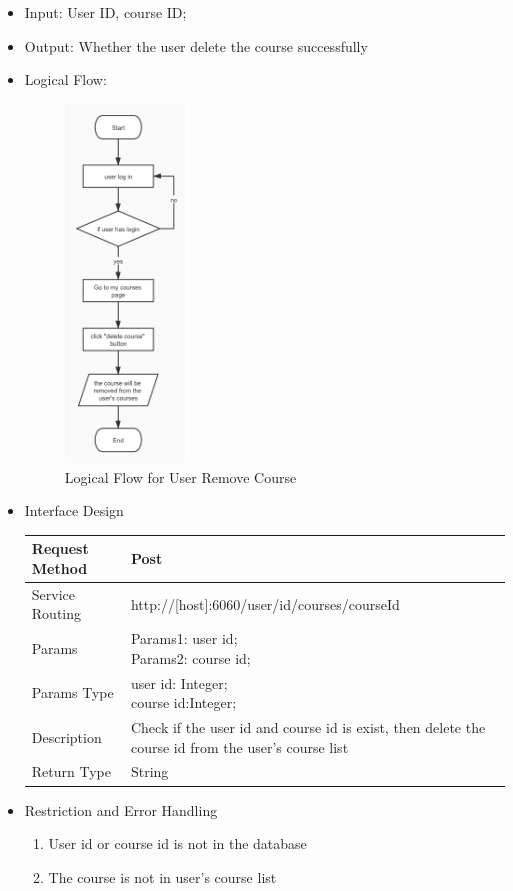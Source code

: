 \documentclass[16pt]{scrreprt}
\begin{document}
\begin{itemize}
	\item Input: User ID, course ID; 
	\item Output: Whether the user delete the course successfully
	\item Logical Flow:
	 \begin{figure}[H]
	\centering
	\includegraphics[width=0.3\textwidth]{diagrams/user-remove-course.jpg}
	\caption{Logical Flow for User Remove Course}
\end{figure}
	\item Interface Design
	\begin{center}
    \begin{tabular}{p{5cm}p{10cm}}
        \hline
	    Request Method & Post\\
        \hline
	    Service Routing &  http://[host]:6060/user/{id}/courses/{courseId}\\
        \hline
	    Params & \makecell[l]{Params1: user id;\\ Params2: course id;}\\ 
        \hline
        Params Type & \makecell[l]{user id: Integer;\\course id:Integer;}\\
        \hline
        Description & Check if the user id and course id is exist, then delete the course id from the user's course list\\
        \hline
        Return Type & String\\
        \hline
    \end{tabular}
\end{center}
\item Restriction and Error Handling\\
\begin{enumerate}
	\item User id or course id is not in the database
	\item The course is not in user's course list
\end{enumerate} 
\end{itemize}
\end{document}
